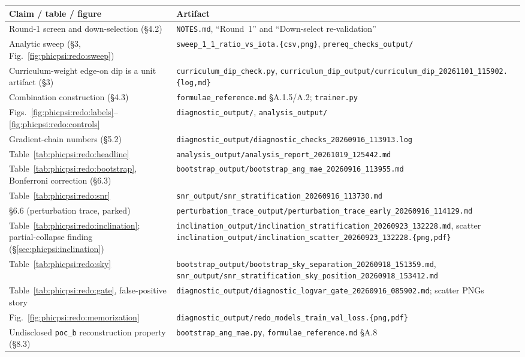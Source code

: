 \begin{table}[tbp]
    \centering
    \small
    \begin{tabular}{@{}p{}p{}@{}}
        \toprule
        Claim / table / figure & Artifact \\
        \midrule
        Round-1 screen and down-selection (\S4.2) & \texttt{NOTES.md}, ``Round~1'' and ``Down-select re-validation'' \\
        Analytic sweep (\S3, Fig.~\ref{fig:phicpsi:redo:sweep}) & \texttt{sweep\_1\_1\_ratio\_vs\_iota.\{csv,png\}}, \texttt{prereq\_checks\_output/} \\
        Curriculum-weight edge-on dip is a unit artifact (\S3) & \texttt{curriculum\_dip\_check.py}, \texttt{curriculum\_dip\_output/curriculum\_dip\_20261101\_115902.\{log,md\}} \\
        Combination construction (\S4.3) & \texttt{formulae\_reference.md} \S A.1.5/A.2; \texttt{trainer.py} \\
        Figs.~\ref{fig:phicpsi:redo:labels}--\ref{fig:phicpsi:redo:controls} & \texttt{diagnostic\_output/}, \texttt{analysis\_output/} \\
        Gradient-chain numbers (\S5.2) & \texttt{diagnostic\_output/diagnostic\_checks\_20260916\_113913.log} \\
        Table~\ref{tab:phicpsi:redo:headline} & \texttt{analysis\_output/analysis\_report\_20261019\_125442.md} \\
        Table~\ref{tab:phicpsi:redo:bootstrap}, Bonferroni correction (\S6.3) & \texttt{bootstrap\_output/bootstrap\_ang\_mae\_20260916\_113955.md} \\
        Table~\ref{tab:phicpsi:redo:snr} & \texttt{snr\_output/snr\_stratification\_20260916\_113730.md} \\
        \S6.6 (perturbation trace, parked) & \texttt{perturbation\_trace\_output/perturbation\_trace\_early\_20260916\_114129.md} \\
        Table~\ref{tab:phicpsi:redo:inclination}; partial-collapse finding (\S\ref{sec:phicpsi:inclination}) & \texttt{inclination\_output/inclination\_stratification\_20260923\_132228.md}, scatter \texttt{inclination\_output/inclination\_scatter\_20260923\_132228.\{png,pdf\}} \\
        Table~\ref{tab:phicpsi:redo:sky} & \texttt{bootstrap\_output/bootstrap\_sky\_separation\_20260918\_151359.md}, \texttt{snr\_output/snr\_stratification\_sky\_position\_20260918\_153412.md} \\
        Table~\ref{tab:phicpsi:redo:gate}, false-positive story & \texttt{diagnostic\_output/diagnostic\_logvar\_gate\_20260916\_085902.md}; scatter PNGs \\
        Fig.~\ref{fig:phicpsi:redo:memorization} & \texttt{diagnostic\_output/redo\_models\_train\_val\_loss.\{png,pdf\}} \\
        Undisclosed \texttt{poc\_b} reconstruction property (\S8.3) & \texttt{bootstrap\_ang\_mae.py}, \texttt{formulae\_reference.md} \S A.8 \\
        \bottomrule
    \end{tabular}
\end{table}

